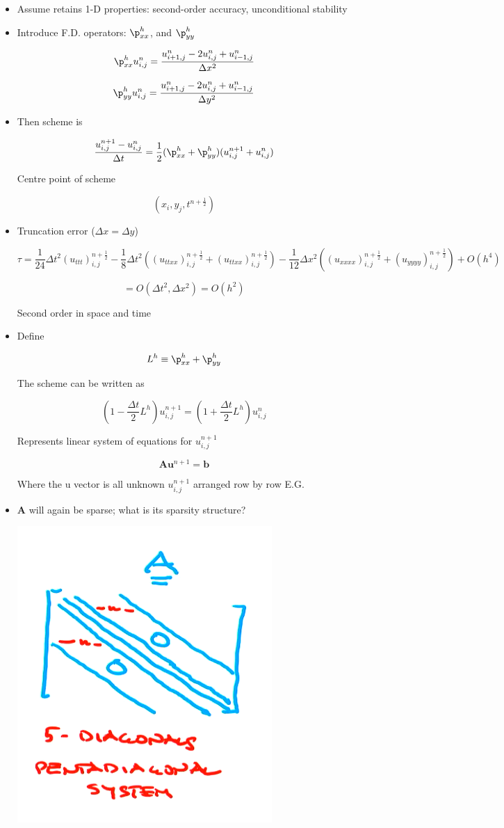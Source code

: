 \begin{itemize}
    \item Assume retains 1-D properties: second-order accuracy, unconditional stability

    \item Introduce F.D. operators: $\p_{xx}^h$, and $\p_{yy}^h$

    \[ \p_{xx}^h u_{i,j}^n =  \frac{ u^n_{i+1,j} - 2u^n_{i,j}+u^n_{i-1,j}}{\Delta x^2}\]

    \[ \p_{yy}^h u_{i,j}^n = \frac{ u^n_{i+1,j} - 2u^n_{i,j}+u^n_{i-1,j}}{\Delta y^2}\]

    \item Then scheme is 

    \[ \frac{u_{i,j}^{n+1}-u_{i,j}^n}{\Delta t} = \frac{1}{2} ( \p_{xx}^h + \p_{yy}^h ) ( u_{i,j}^{n+1} + u_{i,j}^n)\]

    Centre point of scheme

    \[ (x_i, y_j, t^{n+\frac{1}{2}})\]

    \item Truncation error ($\Delta x = \Delta y$)

    \[ \tau = \frac{1}{24} \Delta t^2 (u_{ttt})_{i,j}^{n+\frac{1}{2}} - \frac{1}{8} \Delta t^2 ((u_{ttxx})_{i,j}^{n+\frac{1}{2}}+ (u_{ttxx})_{i,j}^{n+\frac{1}{2}}) - \frac{1}{12} \Delta x^2 ((u_{xxxx})_{i,j}^{n+\frac{1}{2}} + (u_{yyyy})^{n+\frac{1}{2}}_{i,j}) + O(h^4)\]

    \[ = O(\Delta t^2, \Delta x^2) = O(h^2)\]

    Second order in space and time

    \item Define 

    \[ L^h \equiv \p_{xx}^h + \p_{yy}^h\]

    The scheme can be written as 

    \[ (1- \frac{\Delta t}{2} L^h) u_{i,j}^{n+1} = (1+ \frac{\Delta t}{2} L ^h) u_{i,j}^n\]

    Represents linear system of equations for $u_{i,j}^{n+1}$

    \[ \mathbf{A} \mathbf{u}^{n+1} = \mathbf{b}\]

    Where the u vector is all unknown $u_{i,j}^{n+1}$ arranged row by row E.G.

    \item $\mathbf{A}$ will again be sparse; what is its sparsity structure?

    \includegraphics[width = 0.5\linewidth]{Images/pentadiagonal.png}


\end{itemize}
